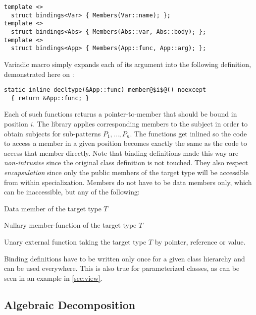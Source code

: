 \begin{lstlisting}
template <> 
  struct bindings<Var> { Members(Var::name); };
template <> 
  struct bindings<Abs> { Members(Abs::var, Abs::body); };
template <> 
  struct bindings<App> { Members(App::func, App::arg); };
\end{lstlisting}

\noindent
Variadic macro  simply expands each of its argument into the 
following definition, demonstrated here on :

\begin{lstlisting}
static inline decltype(&App::func) member@$i$@() noexcept 
  { return &App::func; }
\end{lstlisting}

\noindent
Each of such functions returns a pointer-to-member that should be bound in 
position $i$. The library applies corresponding members to the subject in order 
to obtain subjects for sub-patterns $P_1,...,P_n$. The functions get inlined so 
the code to access a member in a given position becomes exactly the same as the 
code to access that member directly. Note that binding definitions made this way 
are \emph{non-intrusive} since the original class definition is not touched. 
They also respect \emph{encapsulation} since only the public members of the 
target type will be accessible from within  specialization. 
Members do not have to be data members only, which can be inaccessible, but any 
of the following:

\begin{compactitem}
\setlength{\itemsep}{0pt}
\setlength{\parskip}{0pt}
\item Data member of the target type $T$
\item Nullary member-function of the target type $T$
\item Unary external function taking the target type $T$ by pointer, reference or value.
\end{compactitem}

\noindent
Binding definitions have to be written only once for a given class hierarchy and 
can be used everywhere. This is also true for parameterized classes, as can be 
seen in an example in \textsection\ref{sec:view}.


\subsection{Algebraic Decomposition}
\label{sec:slv}

